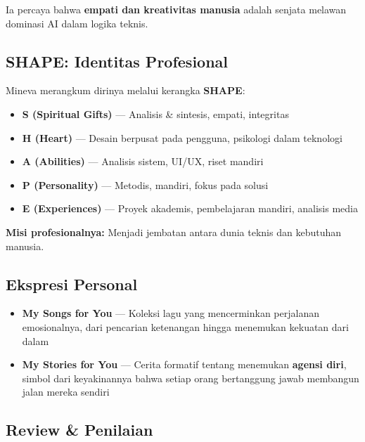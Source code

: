 \documentclass[
  letterpaper,
  DIV=11,
  numbers=noendperiod]{scrreprt}
\providecommand{\tightlist}{%
  \setlength{\itemsep}{0pt}\setlength{\parskip}{0pt}}
\begin{document}
Ia percaya bahwa \textbf{empati dan kreativitas manusia} adalah senjata
melawan dominasi AI dalam logika teknis.

\subsection{\texorpdfstring{\textbf{SHAPE: Identitas
Profesional}}{SHAPE: Identitas Profesional}}\label{shape-identitas-profesional}

Mineva merangkum dirinya melalui kerangka \textbf{SHAPE}:

\begin{itemize}
\tightlist
\item
  \textbf{S (Spiritual Gifts)} --- Analisis \& sintesis, empati,
  integritas
\item
  \textbf{H (Heart)} --- Desain berpusat pada pengguna, psikologi dalam
  teknologi
\item
  \textbf{A (Abilities)} --- Analisis sistem, UI/UX, riset mandiri
\item
  \textbf{P (Personality)} --- Metodis, mandiri, fokus pada solusi
\item
  \textbf{E (Experiences)} --- Proyek akademis, pembelajaran mandiri,
  analisis media
\end{itemize}

\textbf{Misi profesionalnya:} Menjadi jembatan antara dunia teknis dan
kebutuhan manusia.

\subsection{\texorpdfstring{\textbf{Ekspresi
Personal}}{Ekspresi Personal}}\label{ekspresi-personal}

\begin{itemize}
\tightlist
\item
  \textbf{My Songs for You} --- Koleksi lagu yang mencerminkan
  perjalanan emosionalnya, dari pencarian ketenangan hingga menemukan
  kekuatan dari dalam
\item
  \textbf{My Stories for You} --- Cerita formatif tentang menemukan
  \textbf{agensi diri}, simbol dari keyakinannya bahwa setiap orang
  bertanggung jawab membangun jalan mereka sendiri
\end{itemize}

\subsection{\texorpdfstring{\textbf{Review \&
Penilaian}}{Review \& Penilaian}}\label{review-penilaian}
\end{document}
